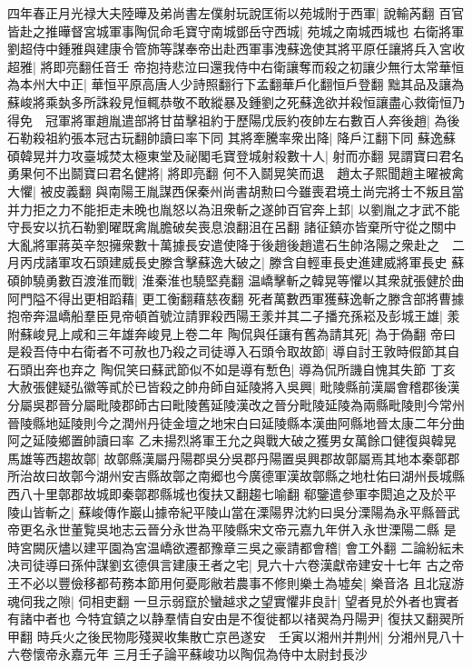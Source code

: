 四年春正月光禄大夫陸曄及弟尚書左僕射玩說匡術以苑城附于西軍|{
	說輸芮翻}
百官皆赴之推曄督宮城軍事陶侃命毛寶守南城鄧岳守西城|{
	苑城之南城西城也}
右衛將軍劉超侍中鍾雅與建康令管斾等謀奉帝出赴西軍事洩蘇逸使其將平原任讓將兵入宮收超雅|{
	將即亮翻任音壬}
帝抱持悲泣曰還我侍中右衛讓奪而殺之初讓少無行太常華恒為本州大中正|{
	華恒平原高唐人少詩照翻行下孟翻華戶化翻恒戶登翻}
黜其品及讓為蘇峻將乘埶多所誅殺見恒輒恭敬不敢縱暴及鍾劉之死蘇逸欲并殺恒讓盡心救衛恒乃得免　冠軍將軍趙胤遣部將甘苗擊祖約于歷陽戊辰約夜帥左右數百人奔後趙|{
	為後石勒殺祖約張本冠古玩翻帥讀曰率下同}
其將牽騰率衆出降|{
	降戶江翻下同}
蘇逸蘇碩韓晃并力攻臺城焚太極東堂及祕閣毛寶登城射殺數十人|{
	射而亦翻}
晃謂寶曰君名勇果何不出鬬寶曰君名健將|{
	將即亮翻}
何不入鬬晃笑而退　趙太子熙聞趙主曜被禽大懼|{
	被皮義翻}
與南陽王胤謀西保秦州尚書胡勲曰今雖喪君境土尚完將士不叛且當并力拒之力不能拒走未晚也胤怒以為沮衆斬之遂帥百官奔上邽|{
	以劉胤之才武不能守長安以抗石勒劉曜既禽胤膽破矣喪息浪翻沮在呂翻}
諸征鎮亦皆棄所守從之關中大亂將軍蔣英辛恕擁衆數十萬據長安遣使降于後趙後趙遣石生帥洛陽之衆赴之　二月丙戌諸軍攻石頭建威長史滕含擊蘇逸大破之|{
	滕含自輕車長史進建威將軍長史}
蘇碩帥驍勇數百渡淮而戰|{
	淮秦淮也驍堅堯翻}
温嶠擊斬之韓晃等懼以其衆就張健於曲阿門隘不得出更相蹈藉|{
	更工衡翻藉慈夜翻}
死者萬數西軍獲蘇逸斬之滕含部將曹據抱帝奔温嶠船羣臣見帝頓首號泣請罪殺西陽王羕并其二子播充孫崧及彭城王雄|{
	羕附蘇峻見上咸和三年雄奔峻見上卷二年}
陶侃與任讓有舊為請其死|{
	為于偽翻}
帝曰是殺吾侍中右衛者不可赦也乃殺之司徒導入石頭令取故節|{
	導自討王敦時假節其自石頭出奔也弃之}
陶侃笑曰蘇武節似不如是導有慙色|{
	導為侃所譏自愧其失節}
丁亥大赦張健疑弘徽等貳於已皆殺之帥舟師自延陵將入吳興|{
	毗陵縣前漢屬會稽郡後漢分屬吳郡晉分屬毗陵郡師古曰毗陵舊延陵漢改之晉分毗陵延陵為兩縣毗陵則今常州晉陵縣地延陵則今之潤州丹徒金壇之地宋白曰延陵縣本漢曲阿縣地晉太康二年分曲阿之延陵鄉置帥讀曰率}
乙未揚烈將軍王允之與戰大破之獲男女萬餘口健復與韓晃馬雄等西趨故鄣|{
	故鄣縣漢屬丹陽郡吳分吳郡丹陽置吳興郡故鄣屬焉其地本秦鄣郡所治故曰故鄣今湖州安吉縣故鄣之南郷也今廣德軍漢故鄣縣之地杜佑曰湖州長城縣西八十里鄣郡故城即秦鄣郡縣城也復扶又翻趨七喻翻}
郗鑒遣參軍李閎追之及於平陵山皆斬之|{
	蘇峻傳作巖山據帝紀平陵山當在溧陽界沈約曰吳分溧陽為永平縣晉武帝更名永世董覧吳地志云晉分永世為平陵縣宋文帝元嘉九年併入永世溧陽二縣}
是時宮闕灰燼以建平園為宮温嶠欲遷都豫章三吳之豪請都會稽|{
	會工外翻}
二論紛紜未决司徒導曰孫仲謀劉玄德俱言建康王者之宅|{
	見六十六卷漢獻帝建安十七年}
古之帝王不必以豐儉移都苟務本節用何憂彫敝若農事不修則樂土為墟矣|{
	樂音洛}
且北寇游魂伺我之隙|{
	伺相吏翻}
一旦示弱竄於蠻越求之望實懼非良計|{
	望者見於外者也實者有諸中者也}
今特宜鎮之以静羣情自安由是不復徙都以禇翜為丹陽尹|{
	復扶又翻翜所甲翻}
時兵火之後民物彫殘翜收集散亡京邑遂安　壬寅以湘州并荆州|{
	分湘州見八十六卷懷帝永嘉元年}
三月壬子論平蘇峻功以陶侃為侍中太尉封長沙

